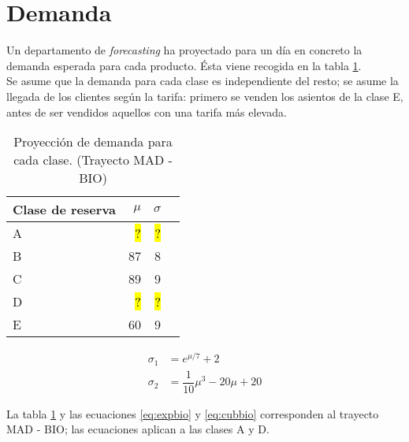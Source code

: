 \documentclass[12pt]{article}
\begin{document}
\section{Demanda}

Un departamento de \emph{forecasting} ha proyectado para un día en concreto la demanda esperada para cada producto. Ésta viene recogida en la tabla \ref{tab:demanda}.\\

Se asume que la demanda para cada clase es independiente del resto; se asume la llegada de los clientes según la tarifa: primero se venden los asientos de la clase E, antes de ser vendidos aquellos con una tarifa más elevada.



\begin{table}[!htp]\centering

\begin{tabular}{lrrr}\toprule
Clase de reserva &$\mu$ &$\sigma$ \\\midrule
A &\hl{ ? } &\hl{ ? } \\
B &87 &8 \\
C &89 &9 \\
D &\hl{ ? } &\hl{ ? } \\
E &60 &9 \\
\bottomrule
\end{tabular}

\caption{Proyección de demanda para cada clase. (Trayecto MAD - BIO)}\label{tab:demanda}
\end{table}





\begin{align}
\sigma_1 &= e^{\mu / 7} + 2\label{eq:expbio}\\[8px]
\sigma_2 &= \dfrac{1}{10}\mu^{3} -20\mu + 20\label{eq:cubbio}
\end{align}

\vspace{10pt}

La tabla \ref{tab:demanda} y las ecuaciones \eqref{eq:expbio} y \eqref{eq:cubbio} corresponden al trayecto MAD - BIO; las ecuaciones aplican a las clases A y D.
\end{document}
